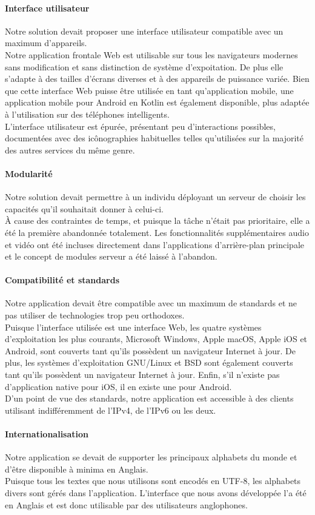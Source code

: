 \paragraph{Interface utilisateur} Notre solution devait proposer une interface utilisateur compatible avec un maximum d'appareils.\\
Notre application frontale Web est utilisable sur tous les navigateurs modernes sans modification et sans distinction de système d'expoitation. De plus elle s'adapte à des tailles d'écrans diverses et à des appareils de puissance variée. Bien que cette interface Web puisse être utilisée en tant qu'application mobile, une application mobile pour Android en Kotlin est également disponible, plus adaptée à l'utilisation sur des téléphones intelligents.\\
L'interface utilisateur est épurée, présentant peu d'interactions possibles, documentées avec des icônographies habituelles telles qu'utilisées sur la majorité des autres services du même genre.

\paragraph{Modularité} Notre solution devait permettre à un individu déployant un serveur de choisir les capacités qu'il souhaitait donner à celui-ci.\\
À cause des contraintes de temps, et puisque la tâche n'était pas prioritaire, elle a été la première abandonnée totalement. Les fonctionnalités supplémentaires audio et vidéo ont été incluses directement dans l'applications d'arrière-plan principale et le concept de modules serveur a été laissé à l'abandon.

\paragraph{Compatibilité et standards} Notre application devait être compatible avec un maximum de standards et ne pas utiliser de technologies trop peu orthodoxes.\\
Puisque l'interface utilisée est une interface Web, les quatre systèmes d'exploitation les plus courants, Microsoft Windows, Apple macOS, Apple iOS et Android, sont couverts tant qu'ils possèdent un navigateur Internet à jour. De plus, les systèmes d'exploitation GNU/Linux et BSD sont également couverts tant qu'ils possèdent un navigateur Internet à jour. Enfin, s'il n'existe pas d'application native pour iOS, il en existe une pour Android.\\
D'un point de vue des standards, notre application est accessible à des clients utilisant indifféremment de l'IPv4, de l'IPv6 ou les deux.

\paragraph{Internationalisation} Notre application se devait de supporter les principaux alphabets du monde et d'être disponible à minima en Anglais.\\
Puisque tous les textes que nous utilisons sont encodés en UTF-8, les alphabets divers sont gérés dans l'application. L'interface que nous avons développée l'a été en Anglais et est donc utilisable par des utilisateurs anglophones.
